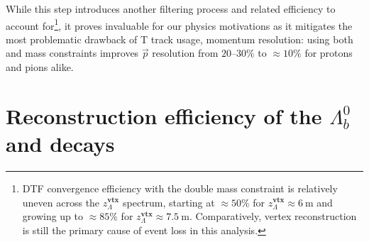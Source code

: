 

While this step introduces another filtering process and related efficiency to account for\footnote{DTF convergence efficiency with the double mass constraint is relatively uneven across the $z_\Lambda^\textbf{vtx}$ spectrum, starting at $\approx 50\%$ for $z_\Lambda^\textbf{vtx} \approx \SI{6}{\meter}$ and growing up to $\approx 85\%$ for $z_\Lambda^\textbf{vtx} \approx \SI{7.5}{\meter}$.
Comparatively, vertex reconstruction is still the primary cause of event loss in this analysis.}, it proves invaluable for our physics motivations as it mitigates the most problematic drawback of T track usage, momentum resolution:
using both \jpsi and \lz mass constraints improves $\vec{p}$ resolution from $20$--$30\%$ to $\approx 10\%$ for protons and pions alike.


\section{Reconstruction efficiency of the \texorpdfstring{$\Lambda^0_b$}{Lambdab} and \texorpdfstring{\lz}{Lambda} decays}
\label{sec:reco_efficiency}

